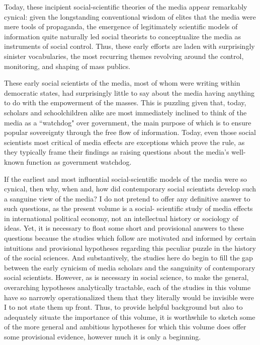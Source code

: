 Today, these incipient social-scientific theories of the media appear remarkably cynical: given the
longstanding conventional wisdom of elites that the media were mere tools of propaganda, the
emergence of legitimately scientific models of information quite naturally led social theorists to
conceptualize the media as instruments of social control. Thus, these early efforts are laden with
surprisingly sinister vocabularies, the most recurring themes revolving around the control,
monitoring, and shaping of mass publics.

These early social scientists of the media, most of whom were writing within democratic states, had
surprisingly little to say about the media having anything to do with the empowerment of the masses.
This is puzzling given that, today, scholars and schoolchildren alike are most immediately inclined
to think of the media as a ``watchdog" over government, the main purpose of which is to ensure
popular sovereignty through the free flow of information. Today, even those social scientists most
critical of media effects are exceptions which prove the rule, as they typically frame their
findings as raising questions about the media's well-known function as government watchdog.

If the earliest and most influential social-scientific models of the media were so cynical, then
why, when and, how did contemporary social scientists develop such a sanguine view of the media? I
do not pretend to offer any definitive answer to such questions, as the present volume is a social-
scientific study of media effects in international political economy, not an intellectual history or
sociology of ideas. Yet, it is necessary to float some short and provisional answers to these
questions because the studies which follow are motivated and informed by certain intuitions and
provisional hypotheses regarding this peculiar puzzle in the history of the social sciences. And
substantively, the studies here do begin to fill the gap between the early cynicism of media
scholars and the sanguinity of contemporary social scientists. However, as is necessary in social
science, to make the general, overarching hypotheses analytically tractable, each of the studies in
this volume have so narrowly operationalized them that they literally would be invisible were I to
not state them up front. Thus, to provide helpful background but also to adequately situate the
importance of this volume, it is worthwhile to sketch some of the more general and ambitious
hypotheses for which this volume does offer some provisional evidence, however much it is only a
beginning.

